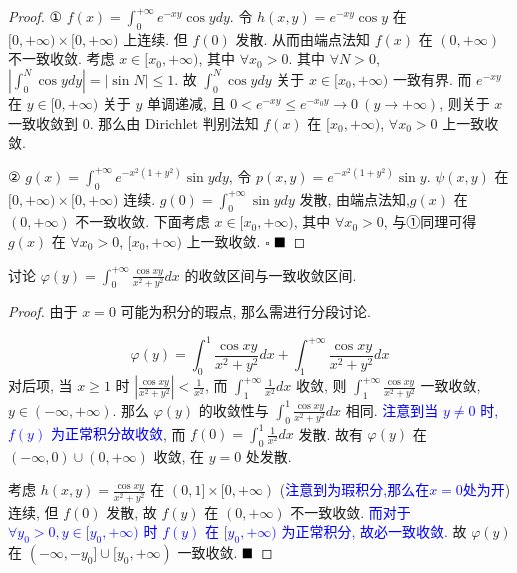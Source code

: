 \documentclass[lang=cn,newtx,10pt,scheme=chinese]{elegantbook}
\begin{document}
\begin{proof}
① $f(x) = \int_{0}^{+\infty} e^{-xy} \cos y dy$. 令 $h(x,y) = e^{-xy} \cos y$ 在 $[0, +\infty) \times [0, +\infty)$ 上连续. 但 $f(0)$ 发散.
从而由端点法知 $f(x)$ 在 $(0, +\infty)$ 不一致收敛.
考虑 $x \in [x_0, +\infty)$, 其中 $\forall x_0 > 0$. 其中 $\forall N > 0$, $|\int_0^N \cos y dy| = |\sin N| \le 1$. 故 $\int_{0}^{N} \cos y dy$ 关于 $x \in [x_0, +\infty)$ 一致有界.
而 $e^{-xy}$ 在 $y \in [0, +\infty)$ 关于 $y$ 单调递减, 且 $0 < e^{-xy} \le e^{-x_0 y} \to 0 \ (y \to +\infty)$, 则关于 $x$ 一致收敛到 0.
那么由 Dirichlet 判别法知 $f(x)$ 在 $[x_0, +\infty)$, $\forall x_0 > 0$ 上一致收敛. 

② $g(x) = \int_{0}^{+\infty} e^{-x^2(1+y^2)} \sin y dy$, 令 $p(x,y) = e^{-x^2(1+y^2)} \sin y$.
$\psi(x,y)$ 在 $[0, +\infty) \times [0, +\infty)$ 连续. $g(0) = \int_{0}^{+\infty} \sin y dy$ 发散, 由端点法知,$g(x)$ 在 $(0, +\infty)$ 不一致收敛. 下面考虑 $x \in [x_0, +\infty)$, 其中 $\forall x_0 > 0$, 与①同理可得 $g(x)$ 在 $\forall x_0 > 0$, $[x_0, +\infty)$ 上一致收敛. $\square$
$\hfill \blacksquare$
\end{proof}

\begin{example}[$\bigstar \bigstar$]
讨论 $\varphi(y) = \int_{0}^{+\infty} \frac{\cos xy}{x^2+y^2} dx$ 的收敛区间与一致收敛区间.
\end{example}

\begin{proof}
由于 $x=0$ 可能为积分的瑕点, 那么需进行分段讨论.

$$ \varphi(y) = \int_{0}^{1} \frac{\cos xy}{x^2+y^2} dx + \int_{1}^{+\infty} \frac{\cos xy}{x^2+y^2} dx $$
对后项, 当 $x \ge 1$ 时 $|\frac{\cos xy}{x^2+y^2}| < \frac{1}{x^2}$, 而 $\int_{1}^{+\infty} \frac{1}{x^2} dx$ 收敛, 则 $\int_{1}^{+\infty}\frac{\cos xy}{x^2+y^2}$ 一致收敛, $y \in (-\infty, +\infty)$.
那么 $\varphi(y)$ 的收敛性与 $\int_{0}^{1} \frac{\cos xy}{x^2+y^2} dx$ 相同.
\textcolor{blue}{注意到当 $y \ne 0$ 时, $f(y)$ 为正常积分故收敛}, 而 $f(0) = \int_{0}^{1} \frac{1}{x^2} dx$ 发散.
故有 $\varphi(y)$ 在 $(-\infty, 0) \cup (0, +\infty)$ 收敛, 在 $y=0$ 处发散.

考虑 $h(x,y) = \frac{\cos xy}{x^2+y^2}$ 在 $(0,1] \times [0, +\infty)$ (\textcolor{blue}{注意到为瑕积分,那么在$x = 0$处为开})连续, 但 $f(0)$ 发散, 故 $f(y)$ 在 $(0, +\infty)$ 不一致收敛.
\textcolor{blue}{而对于 $\forall y_0 > 0, y \in [y_0, +\infty)$ 时 $f(y)$ 在 $[y_0, +\infty)$ 为正常积分, 故必一致收敛.}
故 $\varphi(y)$ 在 $(-\infty, -y_0] \cup [y_0, +\infty)$ 一致收敛. 
$\hfill \blacksquare$
\end{proof}
\end{document}
